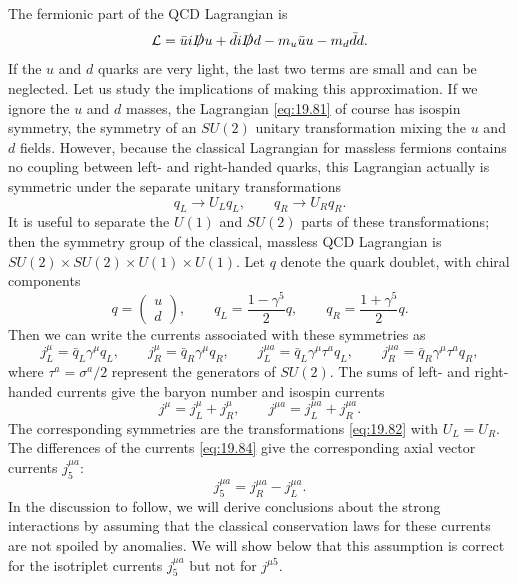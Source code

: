 The fermionic part of the QCD Lagrangian is
\begin{equation}
  \mathcal{L} = \bar{u}i\slashed{D}u + \bar{d}i\slashed{D}d
    - m_u\bar{u}u - m_d\bar{d}d .
  \label{eq:19.81}
\end{equation}
If the $u$ and $d$ quarks are very light, the last two terms are small and
can be neglected.  Let us study the implications of making this
approximation.  If we ignore the $u$ and $d$ masses, the Lagrangian
\eqref{eq:19.81} of course has isospin symmetry, the symmetry of an $SU(2)$
unitary transformation mixing the $u$ and $d$ fields.  However, because the
classical Lagrangian for massless fermions contains no coupling between left-
and right-handed quarks, this Lagrangian actually is symmetric under the
separate unitary transformations
\begin{equation}
  q_L \to U_L q_L,\qquad q_R \to U_R q_R .
  \label{eq:19.82}
\end{equation}
It is useful to separate the $U(1)$ and $SU(2)$ parts of these
transformations; then the symmetry group of the classical, massless QCD
Lagrangian is $SU(2)\times SU(2)\times U(1)\times U(1)$.  Let $q$ denote the
quark doublet, with chiral components
\begin{equation}
  q = \begin{pmatrix}u\\ d\end{pmatrix},\qquad
  q_L = \frac{1-\gamma^5}{2}q,\qquad q_R = \frac{1+\gamma^5}{2}q .
  \label{eq:19.83}
\end{equation}
Then we can write the currents associated with these symmetries as
\begin{equation}
  j^\mu_L = \bar{q}_L\gamma^\mu q_L,\qquad j^\mu_R = \bar{q}_R\gamma^\mu q_R,
  \qquad j^{\mu a}_L = \bar{q}_L\gamma^\mu\tau^a q_L,\qquad
  j^{\mu a}_R = \bar{q}_R\gamma^\mu\tau^a q_R ,
  \label{eq:19.84}
\end{equation}
where $\tau^a = \sigma^a/2$ represent the generators of $SU(2)$.  The sums of
left- and right-handed currents give the baryon number and isospin currents
\begin{equation}
  j^\mu = j^\mu_L + j^\mu_R,\qquad j^{\mu a} = j^{\mu a}_L + j^{\mu a}_R .
  \label{eq:19.85}
\end{equation}
The corresponding symmetries are the transformations \eqref{eq:19.82} with
$U_L = U_R$.  The differences of the currents \eqref{eq:19.84} give the
corresponding axial vector currents $j^{\mu a}_5$:
\begin{equation}
  j^{\mu a}_5 = j^{\mu a}_R - j^{\mu a}_L .
  \label{eq:19.86}
\end{equation}
In the discussion to follow, we will derive conclusions about the strong
interactions by assuming that the classical conservation laws for these
currents are not spoiled by anomalies.  We will show below that this
assumption is correct for the isotriplet currents $j^{\mu a}_5$ but not for
$j^{\mu 5}$.

